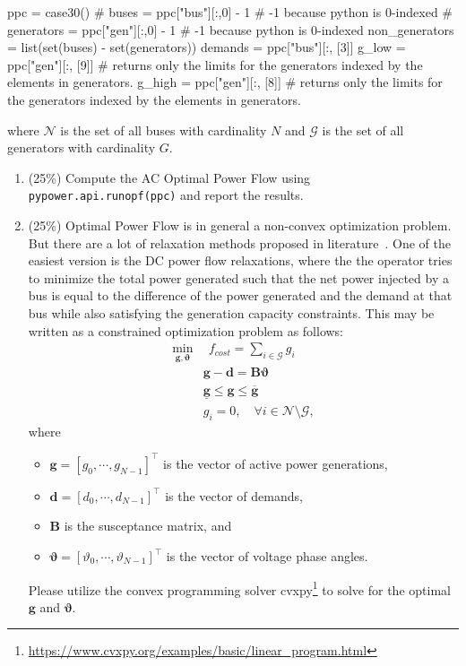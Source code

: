\documentclass[11pt]{exam}
\begin{document}
\begin{questions}
\begin{parts}
\begin{python}
ppc = case30()
# 
buses = ppc["bus"][:,0] - 1 # -1 because python is 0-indexed
# 
generators = ppc["gen"][:,0] - 1 # -1 because python is 0-indexed
non_generators = list(set(buses) - set(generators))
demands = ppc["bus"][:, [3]]
g_low = ppc["gen"][:, [9]] # returns only the limits for the generators indexed by the elements in generators.
g_high = ppc["gen"][:, [8]] # returns only the limits for the generators indexed by the elements in generators.
\end{python}
where $\mathcal{N}$ is the set of all buses with cardinality $N$ and $\mathcal{G}$ is the set of all generators with cardinality $G$.
\begin{enumerate}[label=\roman*.]
\item (25\%) Compute the AC Optimal Power Flow using \texttt{pypower.api.runopf(ppc)} and report the results.
\item (25\%) Optimal Power Flow is in general a non-convex optimization problem. But there are a lot of relaxation methods proposed in literature~\cite{low2014convex}. One of the easiest version is the DC power flow relaxations, where the the operator tries to minimize the total power generated such that the net power injected by a bus is equal to the difference of the power generated and the demand at that bus while also satisfying the generation capacity constraints. This may be written as a constrained optimization problem as follows:
\begin{align}
	\min_{\bm{g},\bm{\vartheta}} & ~~f_{cost} = \sum_{i\in \mathcal{G}}   g_{i}\\
	& \bm{g}  - \bm{d} = \bm{B} \bm{\vartheta}\\
	& \underline{\bm{g}} \le \bm{g} \le \overline{\bm{g}}\\
  & g_i = 0, \quad \forall i \in \mathcal{N} \setminus \mathcal{G},
\end{align}
where
\begin{itemize}
  \item $\bm{g} = [{g}_{0}, \cdots, {g}_{N-1}]^\top$ is the vector of active power generations,
  \item $\bm{d} = [{d}_{0}, \cdots, {d}_{N-1}]^\top$ is the vector of demands,
  \item $\bm{B}$ is the susceptance matrix, and
  \item $\bm{\vartheta} = [{\vartheta}_{0}, \cdots, {\vartheta}_{N-1}]^\top$ is the vector of voltage phase angles.
\end{itemize}

Please utilize the convex programming solver cvxpy\footnote{\url{https://www.cvxpy.org/examples/basic/linear_program.html}} to solve for the optimal $\bm{g}$ and $\bm{\vartheta}$.
\end{enumerate}

\end{parts}
\end{questions}



\end{document}

